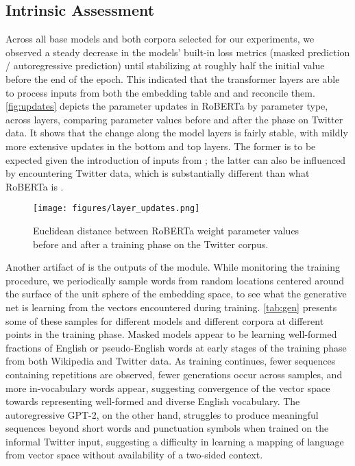 
\subsection{Intrinsic Assessment}

Across all base models and both \ppt{} corpora selected for our experiments, we observed a steady decrease in the \llm{} models' built-in loss metrics (masked prediction / autoregressive prediction) until stabilizing at roughly half the initial value before the end of the \ppt{} epoch.
This indicated that the transformer layers are able to process inputs from both the embedding table and \tok{} and reconcile them.
\autoref{fig:updates} depicts the parameter updates in RoBERTa by parameter type, across layers, comparing parameter values before and after the \ppt{} phase on Twitter data.
It shows that the change along the model layers is fairly stable, with mildly more extensive updates in the bottom and top layers.
The former is to be expected given the introduction of inputs from \tok{}; the latter can also be influenced by encountering Twitter data, which is substantially different than what RoBERTa is .

\begin{figure}
    \centering
    \texttt{[image: figures/layer\_updates.png]}
    \caption{Euclidean distance between RoBERTa weight parameter values before and after a \ppt{} training phase on the Twitter corpus.}
    \label{fig:updates}
\end{figure}



Another artifact of \ppt{} is the outputs of the \detok{} module.
While monitoring the training procedure, we periodically sample words from random locations centered around the surface of the unit sphere of the embedding space, to see what  the generative net is learning from the vectors encountered during training.
\autoref{tab:gen} presents some of these samples for different models and different corpora at different points in the training phase.
Masked models appear to be learning well-formed fractions of English or pseudo-English words at early stages of the training phase from both Wikipedia and Twitter data.
As training continues, fewer sequences containing repetitions are observed, fewer generations occur across  samples, and more in-vocabulary words appear, suggesting convergence of the vector space towards representing well-formed and diverse English vocabulary.
The autoregressive GPT-2, on the other hand, struggles to produce meaningful sequences beyond short words and punctuation symbols when trained on the informal Twitter input, suggesting a difficulty in learning a mapping of language from vector space without availability of a two-sided context.

